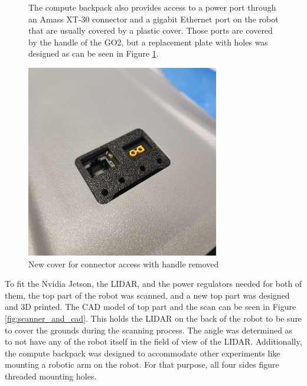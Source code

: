 \documentclass[12pt]{article}
\begin{document}
        \begin{figure}[H]
            \centering
            \begin{minipage}{0.45\textwidth}
                The compute backpack also provides access to a power port through an Amass XT-30 connector and a gigabit Ethernet port on the robot that are usually covered by a plastic cover. Those ports are covered by the handle of the GO2, but a replacement plate with holes was designed as can be seen in Figure \ref{fig:handle_cover}.
            \end{minipage}%
            \hfill
            \begin{minipage}{0.5\textwidth}
                \centering
                \includegraphics[width=0.75\textwidth]{Images/PortsWithCover.jpg}
                \caption{New cover for connector access with handle removed}
                \label{fig:handle_cover}
            \end{minipage}
        \end{figure}
        To fit the Nvidia Jetson, the LIDAR, and the power regulators needed for both of them, the top part of the robot was scanned, and a new top part was designed and 3D printed. The CAD model of top part and the scan can be seen in Figure \ref{fig:scanner_and_cad}. This holds the LIDAR on the back of the robot to be sure to cover the grounds during the scanning process. The angle was determined as to not have any of the robot itself in the field of view of the LIDAR. Additionally, the compute backpack was designed to accommodate other experiments like mounting a robotic arm on the robot. For that purpose, all four sides figure threaded mounting holes.
\end{document}
